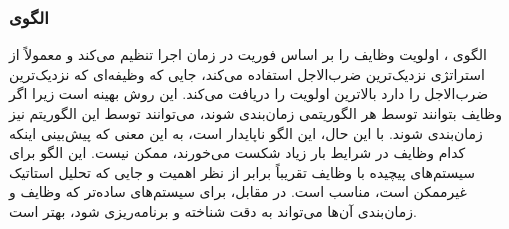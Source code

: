 \subsubsection{الگوی }
\label{archConDynPriorSec}
\begin{RTL}
الگوی  \cite{ref4}، اولویت وظایف را بر اساس فوریت
در زمان اجرا تنظیم می‌کند و معمولاً از استراتژی نزدیک‌ترین ضرب‌الاجل
استفاده می‌کند، جایی که وظیفه‌ای که نزدیک‌ترین ضرب‌الاجل را دارد
بالاترین اولویت را دریافت می‌کند. این روش بهینه است زیرا اگر
وظایف بتوانند توسط هر الگوریتمی زمان‌بندی شوند، می‌توانند توسط این
الگوریتم نیز زمان‌بندی شوند. با این حال، این الگو ناپایدار است،
به این معنی که پیش‌بینی اینکه کدام وظایف در شرایط بار زیاد شکست می‌خورند،
ممکن نیست. این الگو برای سیستم‌های پیچیده با وظایف تقریباً برابر از
نظر اهمیت و جایی که تحلیل استاتیک غیرممکن است، مناسب است.
در مقابل،  برای سیستم‌های
ساده‌تر که وظایف و زمان‌بندی آن‌ها می‌تواند به دقت شناخته و برنامه‌ریزی شود،
بهتر است.
\end{RTL}